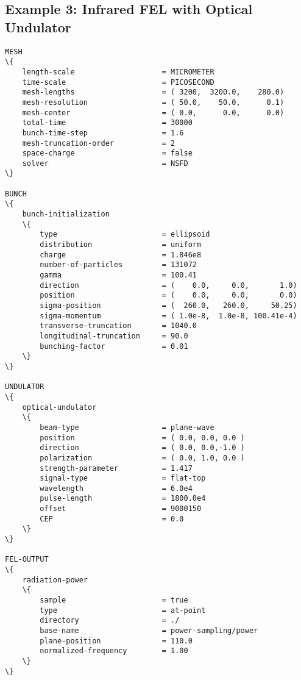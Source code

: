 \begin{appendices}
\section{Example 3: Infrared FEL with Optical Undulator}
\label{job_file_3}

\begin{snugshade}
\begin{Verbatim}[fontsize=\footnotesize, tabsize=4, fontfamily=courier, fontseries=b, commandchars=\\\{\}, obeytabs]
MESH
\{
	length-scale					= MICROMETER
	time-scale						= PICOSECOND
	mesh-lengths					= ( 3200,  3200.0,    280.0)
	mesh-resolution					= ( 50.0,    50.0,      0.1)
	mesh-center						= ( 0.0,      0.0,      0.0)
	total-time						= 30000
	bunch-time-step					= 1.6
	mesh-truncation-order			= 2
	space-charge					= false
	solver							= NSFD
\}
	
BUNCH
\{
	bunch-initialization
	\{
		type						= ellipsoid
		distribution				= uniform
		charge						= 1.846e8
		number-of-particles			= 131072
		gamma						= 100.41
		direction					= (    0.0,     0.0,       1.0)
		position					= (    0.0,     0.0,       0.0)
		sigma-position				= (  260.0,   260.0,     50.25)
		sigma-momentum				= ( 1.0e-8,  1.0e-8, 100.41e-4)
		transverse-truncation		= 1040.0
		longitudinal-truncation		= 90.0
		bunching-factor				= 0.01
	\}
\}
	
UNDULATOR
\{
	optical-undulator
	\{
		beam-type					= plane-wave
		position					= ( 0.0, 0.0, 0.0 )
		direction					= ( 0.0, 0.0,-1.0 )
		polarization				= ( 0.0, 1.0, 0.0 )
		strength-parameter			= 1.417
		signal-type					= flat-top
		wavelength					= 6.0e4
		pulse-length				= 1800.0e4
		offset						= 9000150
		CEP							= 0.0
	\}
\}
	
FEL-OUTPUT
\{
	radiation-power
	\{
		sample						= true
		type						= at-point
		directory					= ./
		base-name					= power-sampling/power
		plane-position				= 110.0
		normalized-frequency		= 1.00
	\}
\}
	\end{Verbatim}
\end{snugshade}

\end{appendices}